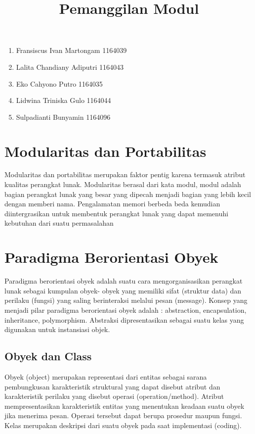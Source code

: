 \documentclass[12pt,a4paper]{article}
\begin{document}
\title{Pemanggilan Modul}
\maketitle
\begin{enumerate}
\item Fransiscus Ivan Martongam      1164039 \\
\item Lalita Chandiany Adiputri      1164043\\
\item Eko Cahyono Putro              1164035\\
\item Lidwina Triniska Gulo          1164044\\
\item Sulpadianti Bunyamin           1164096\\
\end{enumerate}

\section{Modularitas dan Portabilitas}
Modularitas dan portabilitas merupakan faktor pentig karena termasuk atribut kualitas perangkat lunak. Modularitas berasal dari kata modul, modul adalah bagian perangkat lunak yang besar yang dipecah menjadi bagian yang lebih kecil dengan memberi nama. Pengalamatan memori berbeda beda kemudian diintergrasikan untuk membentuk perangkat lunak yang dapat memenuhi kebutuhan dari suatu permasalahan

\section{Paradigma Berorientasi Obyek}
Paradigma berorientasi obyek adalah suatu cara mengorganisasikan perangkat lunak sebagai kumpulan obyek- obyek yang memiliki sifat (struktur data) dan perilaku (fungsi) yang saling berinteraksi melalui pesan (message). Konsep yang menjadi pilar paradigma berorientasi obyek adalah : abstraction, encapsulation, inheritance, polymorphism. Abstraksi dipresentasikan sebagai suatu kelas yang digunakan untuk instansiasi objek.

\subsection{Obyek dan Class}
Obyek (object) merupakan representasi dari entitas sebagai sarana pembungkusan karakteristik struktural
yang dapat disebut atribut dan karakteristik perilaku yang disebut operasi (operation/method). Atribut 
mempresentasikan karakteristik entitas yang menentukan keadaan suatu obyek jika menerima pesan.
Operasi tersebut dapat berupa prosedur maupun fungsi. Kelas merupakan deskripsi dari suatu obyek pada 
saat implementasi (coding).
\end{document}
